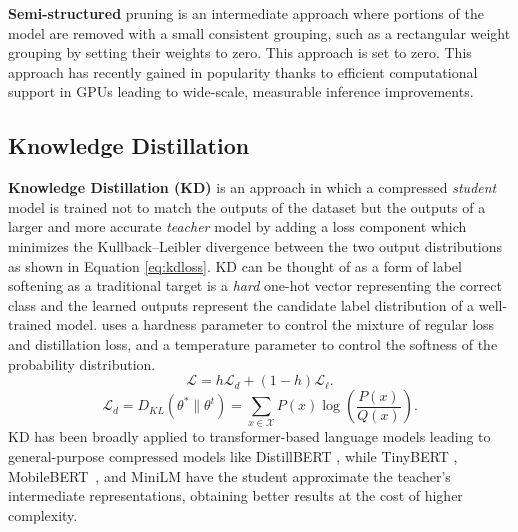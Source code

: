 \textbf{Semi-structured} pruning is an intermediate approach where portions of the model are removed with a small consistent grouping, such as a rectangular weight grouping \cite{lagunas21block} by setting their weights to zero. This approach is set to zero. This approach has recently gained in popularity thanks to efficient computational support in GPUs leading to wide-scale, measurable inference improvements.
\subsection{Knowledge Distillation}
\textbf{Knowledge Distillation (KD)} \cite{Hinton2015DistillingTK} is an approach in which a compressed \textit{student} model is trained not to match the outputs of the dataset but the outputs of a larger and more accurate \textit{teacher} model by adding a loss component which minimizes the Kullback–Leibler divergence between the two output distributions as shown in Equation \ref{eq:kdloss}. KD can be thought of as a form of label softening as a traditional target is a \textit{hard} one-hot vector representing the correct class and the learned outputs represent the candidate label distribution of a well-trained model.
uses a hardness parameter to control the mixture of regular loss and distillation loss, and a temperature parameter to control the softness of the probability distribution.\\
\begin{equation}
    \mathcal{L}= h \mathcal{L}_d + (1-h) \mathcal{L}_{\ell}. 
\label{eq:kdloss}
\end{equation}
 \begin{equation}
     \mathcal{L}_d= {\displaystyle D_{\textit{KL}}(\theta^* \parallel \theta^\textit{t})=\sum _{x\in {\mathcal {X}}}P(x)\log \left({\frac {P(x)}{Q(x)}}\right).}
 \label{eq:kl}
 \end{equation}
KD has been broadly applied to transformer-based language models leading to general-purpose compressed models like DistillBERT \cite{Sanh2019DistilBERTAD}, while TinyBERT \cite{Jiao2020TinyBERTDB}, MobileBERT~\cite{Sun2020MobileBERTAC}, and MiniLM \cite{Wang2020MiniLMDS} have the student approximate the teacher's intermediate representations, obtaining better results at the cost of higher complexity. 
